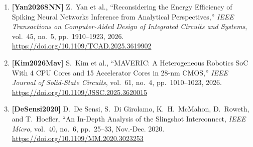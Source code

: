 \begin{enumerate}
    \item \textbf{[Yan2026SNN]} Z.~Yan et al., ``Reconsidering the Energy Efficiency of Spiking Neural Networks Inference from Analytical Perspectives,'' \emph{IEEE Transactions on Computer-Aided Design of Integrated Circuits and Systems}, vol.~45, no.~5, pp.~1910--1923, 2026. \url{https://doi.org/10.1109/TCAD.2025.3619902}
    \item \textbf{[Kim2026Mav]} S.~Kim et al., ``MAVERIC: A Heterogeneous Robotics SoC With 4 CPU Cores and 15 Accelerator Cores in 28-nm CMOS,'' \emph{IEEE Journal of Solid-State Circuits}, vol.~61, no.~4, pp.~1010--1023, 2026. \url{https://doi.org/10.1109/JSSC.2025.3620015}

    \item \textbf{[DeSensi2020]} D.~De Sensi, S.~Di Girolamo, K.~H.~McMahon, D.~Roweth, and T.~Hoefler, ``An In-Depth Analysis of the Slingshot Interconnect, \emph{IEEE Micro}, vol.~40, no.~6, pp.~25--33, Nov.-Dec. 2020. \url{https://doi.org/10.1109/MM.2020.3023253}
\end{enumerate}
